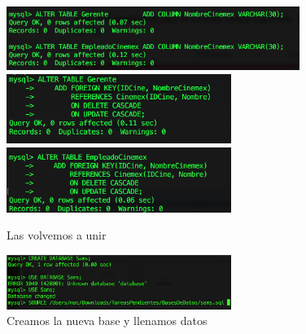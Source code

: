 \documentclass[12pt, fleqn]{article}                             %
\begin{document}
        \begin{figure}[h]
            \centering
            \includegraphics[width=0.85\textwidth]{BD2Reporte12}
            \includegraphics[width=0.65\textwidth]{BD2Reporte13}
            \includegraphics[width=0.65\textwidth]{BD2Reporte14}
            \caption{Las volvemos a unir}
        \end{figure}



        \begin{figure}[h]
            \centering
            \includegraphics[width=0.65\textwidth]{DBExterna0}
            \caption{Creamos la nueva base y llenamos datos}
        \end{figure}
\end{document}
